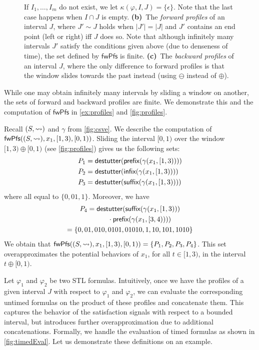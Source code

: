 \begin{figure*}[!t]
{		If $I_1, \ldots, I_m$ do not exist, we let $\kappa(\varphi, I, J) = \{\epsilon\}$.
		Note that the last case happens when $I \cap J$ is empty.
		\textbf{(b)}~The \emph{forward profiles} of an interval $J$, where $J' \sim J$ holds when $|J'| = |J|$ and $J'$ contains an end point (left or right) iff $J$ does so.
		Note that although infinitely many intervals $J'$ satisfy the conditions given above (due to denseness of time), the set defined by $\mathsf{fwPfs}$ is finite.
		\textbf{(c)}~The \emph{backward profiles} of an interval $J$, where the only difference to forward profiles is that the window slides towards the past instead (using $\ominus$ instead of $\oplus$).
		\label{fig:profilesDefn}}
\end{figure*}

While one may obtain infinitely many intervals by sliding a window on another, the sets of forward and backward profiles are finite.
We demonstrate this and the computation of $\mathsf{fwPfs}$ in \cref{ex:profiles} and \cref{fig:profiles}.

\begin{example} \label{ex:profiles}
	Recall $(S, {\rightsquigarrow})$ and $\gamma$ from \cref{fig:csve}.
	We describe the computation of $\mathsf{fwPfs}((S,{\rightsquigarrow}), x_1, [1,3), [0,1))$.
	Sliding the interval $[0,1)$ over the window $[1,3) \oplus [0,1)$ (see \cref{fig:profiles}) gives us the following sets:
	\begin{align*}
		P_1 &= \mathsf{destutter}(\textsf{prefix}(\gamma(x_1, [1,3)))) \\
		P_2 &= \mathsf{destutter}(\textsf{infix}(\gamma(x_1, [1,3)))) \\
		P_3 &= \mathsf{destutter}(\textsf{suffix}(\gamma(x_1, [1,3))))
	\end{align*}
	where all equal to $\{ 0, 01, 1 \}$.
	Moreover, we have
	\begin{multline*}
		P_4 = \mathsf{destutter}(\textsf{suffix}(\gamma(x_1, [1,3))) \\ \phantom{kkkkk}\cdot \textsf{prefix}(\gamma(x_1, [3,4)))) \\ = \{ 0, 01, 010, 0101, 01010, 1, 10, 101, 1010 \}
	\end{multline*}
	We obtain that $\mathsf{fwPfs}((S,{\rightsquigarrow}), x_1, [1,3), [0,1)) = \{P_1, P_2, P_3, P_4\}$.
	This set overapproximates the potential behaviors of $x_1$, for all $t \in [1,3)$, in the interval $t \oplus [0,1)$.
\end{example}

Let $\varphi_1$ and $\varphi_2$ be two STL formulas.
Intuitively, once we have the profiles of a given interval $J$ with respect to $\varphi_1$ and $\varphi_2$, we can evaluate the corresponding untimed formulas on the product of these profiles and concatenate them.
This captures the behavior of the satisfaction signals with respect to a bounded interval, but introduces further overapproximation due to additional concatenations.
Formally, we handle the evaluation of timed formulas as shown in \cref{fig:timedEval}.
Let us demonstrate these definitions on an example.

